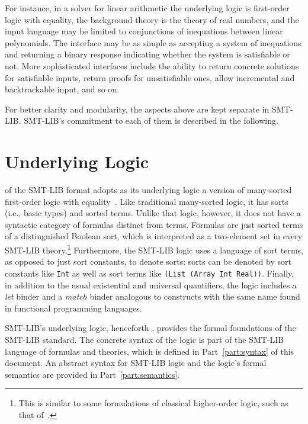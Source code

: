 For instance, in a solver for linear arithmetic
the underlying logic is first-order logic with equality,
the background theory is the theory of real numbers, and
the input language may be limited to conjunctions of inequations 
between linear polynomials.
The interface may be as simple as accepting a system
of inequations and returning a binary response indicating 
whether the system is satisfiable or not.
More sophisticated interfaces include
the ability to return concrete solutions for satisfiable inputs,
return proofs for unsatisfiable ones,
allow incremental and backtrackable input, and so on.

For better clarity and modularity, 
the aspects above are kept separate in SMT-LIB.
SMT-LIB's commitment to each of them is described in the following.


\section{Underlying Logic}


\thisversion of the SMT-LIB format adopts as its underlying logic
a version of many-sorted first-order logic with equality~\cite{Man-MSL-93,Gal-86,Hen-01}.
Like traditional many-sorted logic, it has sorts (i.e., basic types) 
and sorted terms.
Unlike that logic, however,
it does not have a syntactic category of formulas distinct from terms.
Formulas are just sorted terms of a distinguished Boolean sort,
which is interpreted as a two-element set in every SMT-LIB theory.\footnote{This is similar
to some formulations of classical higher-order logic, such as that of~\cite{andrews86}.}
Furthermore, the SMT-LIB logic uses a language of sort terms,
as opposed to just sort constants, to denote sorts:
sorts can be denoted by sort constants like \texttt{Int}
as well as sort terms like
\texttt{(List (Array Int Real))}.
Finally,
in addition to the usual existential and universal quantifiers, 
the logic includes a \emph{let} binder
and a \emph{match} binder
analogous to constructs with the same name
found in functional programming languages.

SMT-LIB's underlying logic,
henceforth ,
provides the formal foundations of the SMT-LIB standard.
The concrete syntax of the logic is part of the SMT-LIB language
of formulas and theories, which is defined in Part~\ref{part:syntax} 
of this document.
An abstract syntax for SMT-LIB logic and 
the logic's formal semantics are provided in Part~\ref{part:semantics}.



